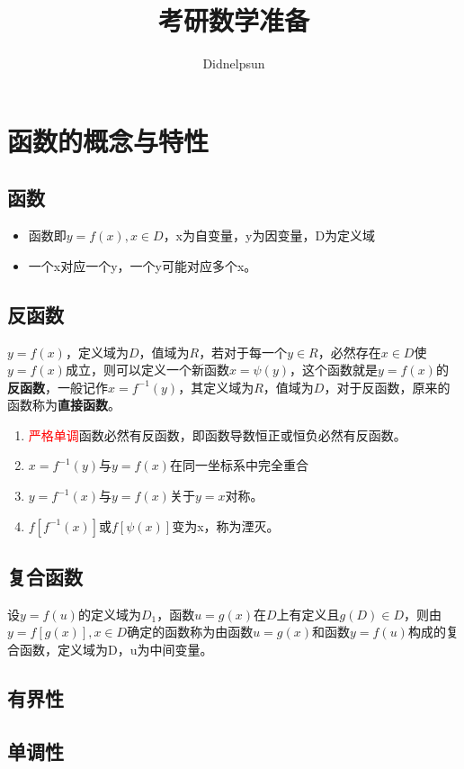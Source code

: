\documentclass[UTF8, 12pt]{ctexart}
\author{Didnelpsun}
\title{考研数学准备}
\begin{document}
\maketitle
\thispagestyle{empty}
\tableofcontents
\thispagestyle{empty}
\newpage
\pagestyle{plain}
\setcounter{page}{1}
\section{函数的概念与特性}
\subsection{函数}
\begin{itemize}
    \item 函数即$y=f(x),x\in D$，x为自变量，y为因变量，D为定义域
    \item 一个x对应一个y，一个y可能对应多个x。
\end{itemize}
\subsection{反函数}
$y=f(x)$，定义域为$D$，值域为$R$，若对于每一个$y\in R$，必然存在$x\in D$使$y=f(x)$成立，则可以定义一个新函数$x=\psi (y)$，这个函数就是$y=f(x)$的\textbf{反函数}，一般记作$x=f^{-1}(y)$，其定义域为$R$，值域为$D$，对于反函数，原来的函数称为\textbf{直接函数}。
\begin{enumerate}
    \item \textcolor{red}{严格单调}函数必然有反函数，即函数导数恒正或恒负必然有反函数。
    \item $x=f^{-1}(y)$与$y=f(x)$在同一坐标系中完全重合
    \item $y=f^{-1}(x)$与$y=f(x)$关于$y=x$对称。
    \item $f[f^{-1}(x)]$或$f[\psi (x)]$变为x，称为湮灭。
\end{enumerate}
\subsection{复合函数}
设$y=f(u)$的定义域为$D_1$，函数$u=g(x)$在$D$上有定义且$g(D)\in D$，则由$y=f[g(x)],x\in D$确定的函数称为由函数$u=g(x)$和函数$y=f(u)$构成的复合函数，定义域为D，u为中间变量。
\subsection{有界性}
\subsection{单调性}
\end{document}
